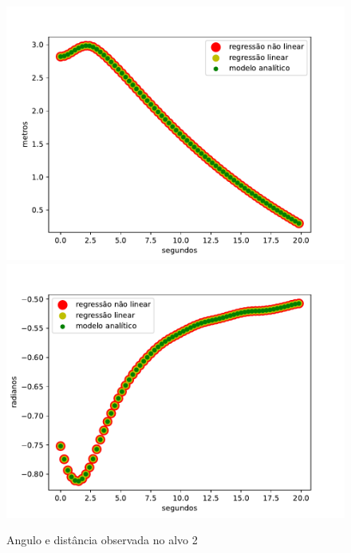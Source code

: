 \begin{figure}[H]
    \centering
    \includegraphics[scale=0.45]{figuras/distance_over_time_2.pdf}
    \includegraphics[scale=0.45]{figuras/angle_over_time_2.pdf}
    \caption{Angulo e distância observada no alvo 2}
\end{figure}

